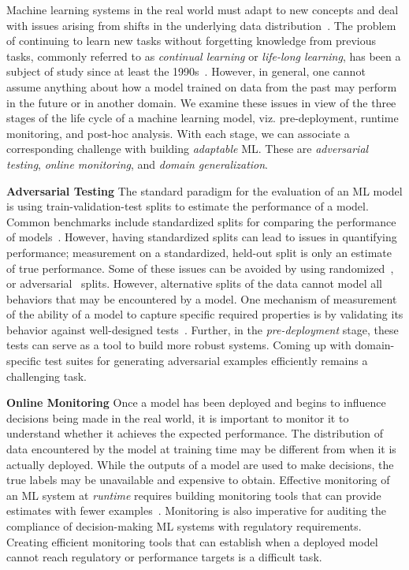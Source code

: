 Machine learning systems in the real world must adapt to new concepts and deal with issues arising from shifts in the underlying data distribution~\citep{huyen2022designing}.
The problem of continuing to learn new tasks without forgetting knowledge from previous tasks, commonly referred to as \textit{continual learning} or \textit{life-long learning}, has been a subject of study since at least the 1990s~\citep{thrun1998lifelong}.
However, in general, one cannot assume anything about how a model trained on data from the past may perform in the future or in another domain. 
We examine these issues in view of the three stages of the life cycle of a machine learning model, viz. pre-deployment, runtime monitoring, and post-hoc analysis.
With each stage, we can associate a corresponding challenge with building \textit{adaptable} ML.
These are \textit{adversarial testing}, 
\textit{online monitoring}, and \textit{domain generalization}.

\noindent \textbf{Adversarial Testing}
The standard paradigm for the evaluation of an ML model is using train-validation-test splits to estimate the performance of a model. 
Common benchmarks include standardized splits for comparing the performance of models~\citep{gorman2019need}.
However, having standardized splits can lead to issues in quantifying performance; measurement on a standardized, held-out split is only an estimate of true performance.
Some of these issues can be avoided by using randomized~\citep{gorman2019need}, or adversarial~\citep{sogaard2021need} splits.
However, alternative splits of the data cannot model all behaviors that may be encountered by a model.
One mechanism of measurement of the ability of a model to capture specific required properties is by validating its behavior against well-designed tests~\cite{ribeiro2020beyond}.
Further, in the \textit{pre-deployment} stage, these tests can serve as a tool to build more robust systems. 
Coming up with domain-specific test suites for generating adversarial examples efficiently remains a challenging task.

\noindent \textbf{Online Monitoring}
Once a model has been deployed and begins to influence decisions being made in the real world, it is important to monitor it to understand whether it achieves the expected performance.
The distribution of data encountered by the model at training time may be different from when it is actually deployed. 
While the outputs of a model are used to make decisions, the true labels may be unavailable and expensive to obtain.
Effective monitoring of an ML system at \textit{runtime} requires building monitoring tools that can provide estimates with fewer examples~\citep{ginart2022mldemon}.
Monitoring is also imperative for auditing the compliance of decision-making ML systems with regulatory requirements.
Creating efficient monitoring tools that can establish when a deployed model cannot reach regulatory or performance targets is a difficult task.

